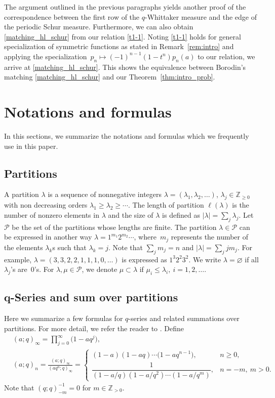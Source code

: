 \documentclass[pdftex]{sigma}
\numberwithin{equation}{section}
\def\i{\infty}
\def\l{\lambda}
\def\Pe{\mathcal{P}}
\def\Z{\mathbb{Z}}
\begin{document}
The argument outlined in the previous paragraphs yields another proof of the correspondence between the first row of the $q$-Whittaker measure and the edge of the periodic Schur measure.
Furthermore, we can also obtain \eqref{matching_hl_schur} from our relation \eqref{t1-1}. Noting \eqref{t1-1} holds for general specialization of symmetric functions as stated in Remark~\ref{rem:intro} and applying the specialization~${p_n\mapsto (-1)^{n-1}(1-t^n)p_n(a)}$ to our relation, we arrive at \eqref{matching_hl_schur}. This shows the equivalence between Borodin's matching \eqref{matching_hl_schur} and our Theorem~\ref{thm:intro_prob}.

\appendix
\section{Notations and formulas}
\label{aa}
 In this sections, we summarize the notations
 and formulas which we frequently use in this paper.
\subsection{Partitions}
\label{a1}
 A partition $\l$
 is a sequence of nonnegative integers
 $\l=(\l_1,\l_2,\dots)$, $\l_j\in\Z_{\ge 0}$ with non decreasing orders $\l_1\ge\l_2\ge\cdots$. The length
 of partition $\ell(\l)$ is the number of nonzero
 elements in $\l$ and the size of $\l$ is defined
 as $|\l|=\sum_{j}\l_j$. Let $\Pe$ be the set of
 the partitions whose lengths are finite.
 The partition $\l\in\Pe$
 can be expressed in another way
 $\l=1^{m_1}2^{m_2}\cdots$, where~$m_j$ represents the number of
 the elements $\l_k$s such that
 $\l_k=j$. Note that $\sum_jm_j=n$
 and $|\l|=\sum_{j} jm_j$.
 For example, $\l=(3,3,2,2,1,1,1,0,\dots)$ is
 expressed as $1^3 2^2 3^2$. We write $\lambda=\varnothing$ if all $\lambda_j$'s are~0's.
 For $\l,\mu\in\Pe$, we denote $\mu\subset\l$ if
 $\mu_i\le\l_i,~i=1,2,\dots$.

\subsection[q-Series and sum over partitions]{$\boldsymbol{q}$-Series and sum over partitions}
\label{a2}
 Here we summarize a few formulas for $q$-series and related summations over partitions. For more detail, we refer the reader to \cite[Sections~10 and~11]{AndrewsAskeyRoy2000}. Define
\begin{align}
\label{a2-1}
 &(a;q)_\i = \prod_{j=0}^\i \big(1-a q^j\big),
 \\
\label{a2-1d}
 &(a;q)_n = \frac{(a;q)_\i}{(a q^n;q)_\i}
 =
 \begin{cases}
 (1-a)(1-aq)\cdots \big(1-a q^{n-1}\big), & n\ge 0,
 \\
 \dfrac{1}{(1-a/q)(1-a/q^2)\cdots(1-a/q^m)},& n=-m,~m>0.
 \end{cases}
\end{align}
Note that $(q;q)_{-m}^{-1}=0$ for $m\in\Z_{>0}$.
\end{document}
